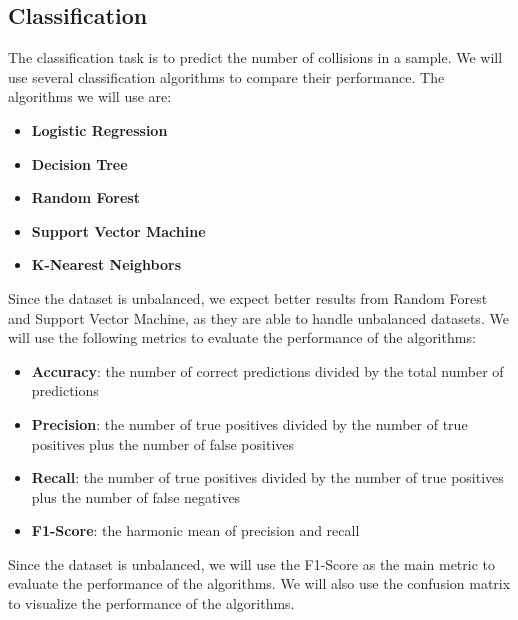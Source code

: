 \subsection{Classification}
The classification task is to predict the number of collisions in a sample. We will use several classification algorithms to compare their performance. The algorithms we will use are:
\begin{itemize}
    \item \textbf{Logistic Regression}
    \item \textbf{Decision Tree}
    \item \textbf{Random Forest}
    \item \textbf{Support Vector Machine}
    \item \textbf{K-Nearest Neighbors}
\end{itemize}
Since the dataset is unbalanced, we expect better results from Random Forest and Support Vector Machine, as they are able to handle unbalanced datasets.
We will use the following metrics to evaluate the performance of the algorithms:
\begin{itemize}
    \item \textbf{Accuracy}: the number of correct predictions divided by the total number of predictions
    \item \textbf{Precision}: the number of true positives divided by the number of true positives plus the number of false positives
    \item \textbf{Recall}: the number of true positives divided by the number of true positives plus the number of false negatives
    \item \textbf{F1-Score}: the harmonic mean of precision and recall
\end{itemize}
Since the dataset is unbalanced, we will use the F1-Score as the main metric to evaluate the performance of the algorithms. We will also use the confusion matrix to visualize the performance of the algorithms.

